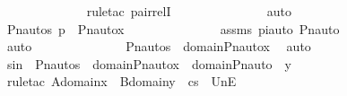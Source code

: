 \begin{isabellebody}
\ \ \ \ \ \ \ \ \ \ \ \ \isamarkupfalse%
\ {\isacharparenleft}{\kern0pt}rule{\isacharunderscore}{\kern0pt}tac\ pair{\isacharunderscore}{\kern0pt}relI{\isacharparenright}{\kern0pt}\ \isanewline
\ \ \ \ \ \ \ \ \ \ \ \ \isamarkupfalse%
\ auto\ \isanewline
\ \ \ \ \ \ \ \ \ \ \isamarkupfalse%
\ \isamarkupfalse%
\ {\isachardoublequoteopen}{\isacharless}{\kern0pt}Pn{\isacharunderscore}{\kern0pt}auto{\isacharparenleft}{\kern0pt}{\isasympi}{\isacharparenright}{\kern0pt}{\isacharbackquote}{\kern0pt}s{\isacharcomma}{\kern0pt}\ {\isasympi}{\isacharbackquote}{\kern0pt}p{\isachargreater}{\kern0pt}\ {\isasymin}\ Pn{\isacharunderscore}{\kern0pt}auto{\isacharparenleft}{\kern0pt}{\isasympi}{\isacharparenright}{\kern0pt}{\isacharbackquote}{\kern0pt}x{\isachardoublequoteclose}\ \isanewline
\ \ \ \ \ \ \ \ \ \ \ \ \isamarkupfalse%
\ assms\ piauto\ Pn{\isacharunderscore}{\kern0pt}auto\ \isanewline
\ \ \ \ \ \ \ \ \ \ \ \ \isamarkupfalse%
\ auto\ \isanewline
\ \ \ \ \ \ \ \ \ \ \isamarkupfalse%
\ \isamarkupfalse%
\ {\isachardoublequoteopen}Pn{\isacharunderscore}{\kern0pt}auto{\isacharparenleft}{\kern0pt}{\isasympi}{\isacharparenright}{\kern0pt}{\isacharbackquote}{\kern0pt}s\ {\isasymin}\ domain{\isacharparenleft}{\kern0pt}Pn{\isacharunderscore}{\kern0pt}auto{\isacharparenleft}{\kern0pt}{\isasympi}{\isacharparenright}{\kern0pt}{\isacharbackquote}{\kern0pt}x{\isacharparenright}{\kern0pt}{\isachardoublequoteclose}\ \isamarkupfalse%
\ auto\ \isanewline
\ \ \ \ \ \ \ \ \isamarkupfalse%
\isanewline
\isanewline
\ \ \ \ \ \ \ \ \isamarkupfalse%
\ s{\isacharprime}{\kern0pt}in\ {\isacharcolon}{\kern0pt}\ {\isachardoublequoteopen}Pn{\isacharunderscore}{\kern0pt}auto{\isacharparenleft}{\kern0pt}{\isasympi}{\isacharparenright}{\kern0pt}{\isacharbackquote}{\kern0pt}s\ {\isasymin}\ domain{\isacharparenleft}{\kern0pt}Pn{\isacharunderscore}{\kern0pt}auto{\isacharparenleft}{\kern0pt}{\isasympi}{\isacharparenright}{\kern0pt}{\isacharbackquote}{\kern0pt}x{\isacharparenright}{\kern0pt}\ {\isasymunion}\ domain{\isacharparenleft}{\kern0pt}Pn{\isacharunderscore}{\kern0pt}auto{\isacharparenleft}{\kern0pt}{\isasympi}{\isacharparenright}{\kern0pt}\ {\isacharbackquote}{\kern0pt}\ y{\isacharparenright}{\kern0pt}{\isachardoublequoteclose}\ \isanewline
\ \ \ \ \ \ \ \ \ \ \isamarkupfalse%
\ {\isacharparenleft}{\kern0pt}rule{\isacharunderscore}{\kern0pt}tac\ A{\isacharequal}{\kern0pt}{\isachardoublequoteopen}domain{\isacharparenleft}{\kern0pt}x{\isacharparenright}{\kern0pt}{\isachardoublequoteclose}\ \ B{\isacharequal}{\kern0pt}{\isachardoublequoteopen}domain{\isacharparenleft}{\kern0pt}y{\isacharparenright}{\kern0pt}{\isachardoublequoteclose}\ \ c{\isacharequal}{\kern0pt}s\ \ UnE{\isacharparenright}{\kern0pt}\ \ \isanewline

\end{isabellebody}
